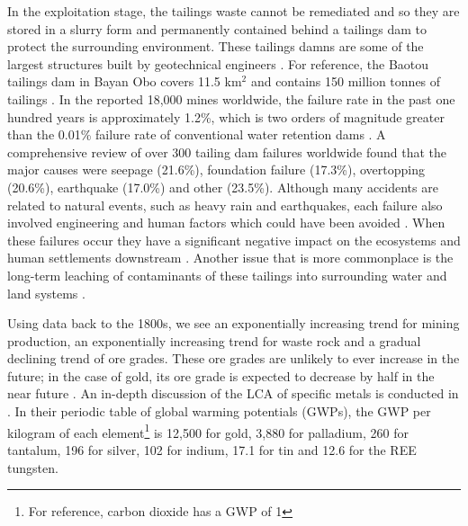 \documentclass{article}
\begin{document}
In the exploitation stage, the tailings waste cannot be remediated and so they are stored in a slurry form and permanently contained behind a tailings dam to protect the surrounding environment. These tailings damns are some of the largest structures built by geotechnical engineers \cite{lyu2019comprehensive}. For reference, the Baotou tailings dam in Bayan Obo covers 11.5 km$^2$ and contains 150 million tonnes of tailings \cite{pan2016investigating}. In the reported 18,000 mines worldwide, the failure rate in the past one hundred years is approximately 1.2\%, which is two orders of magnitude greater than the 0.01\% failure rate of conventional water retention dams \cite{icold2001tailings}. A comprehensive review of over 300 tailing dam failures worldwide found that the major causes were seepage (21.6\%), foundation failure (17.3\%), overtopping (20.6\%), earthquake (17.0\%) and other (23.5\%). Although many accidents are related to natural events, such as heavy rain and earthquakes, each failure also involved engineering and human factors which could have been avoided \cite{lyu2019comprehensive}. When these failures occur they have a significant negative impact  on the ecosystems and human settlements downstream \cite{hudson2003impact}. Another issue that is more commonplace is the long-term leaching of contaminants of these tailings into surrounding water and land systems \cite{guo2013leaching}.

Using data back to the 1800s, we see an exponentially increasing trend for mining production, an exponentially increasing trend for waste rock and a gradual declining trend of ore grades. These ore grades are unlikely to ever increase in the future; in the case of gold, its ore grade is expected to decrease by half in the near future \cite{mudd2007sustainability}. An in-depth discussion of the LCA of specific metals is conducted in \cite{nuss2014life}. In their periodic table of global warming potentials (GWPs), the GWP per kilogram of each element\footnote{For reference, carbon dioxide has a GWP of 1} is 12,500 for gold, 3,880 for palladium, 260 for tantalum, 196 for silver, 102 for indium, 17.1 for tin and 12.6 for the REE tungsten.


\end{document}
